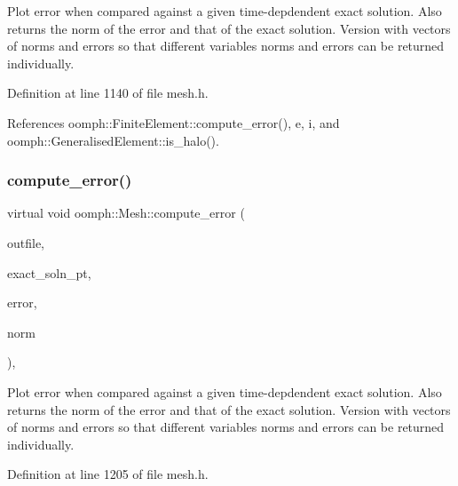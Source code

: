 Plot error when compared against a given time-\/depdendent exact solution. Also returns the norm of the error and that of the exact solution. Version with vectors of norms and errors so that different variables\textquotesingle{} norms and errors can be returned individually. 



Definition at line 1140 of file mesh.\+h.



References oomph\+::\+Finite\+Element\+::compute\+\_\+error(), e, i, and oomph\+::\+Generalised\+Element\+::is\+\_\+halo().

\mbox{\label{classoomph_1_1Mesh_aaf01468aaed8c208faa4bdb474b9519e}} 
\subsubsection{\texorpdfstring{compute\+\_\+error()}{compute\_error()}\hspace{0.1cm}{\footnotesize\ttfamily [4/4]}}
{\footnotesize\ttfamily virtual void oomph\+::\+Mesh\+::compute\+\_\+error (\begin{DoxyParamCaption}\item[{std\+::ostream \&}]{outfile,  }\item[{\hyperlink{classoomph_1_1FiniteElement_a690fd33af26cc3e84f39bba6d5a85202}{Finite\+Element\+::\+Steady\+Exact\+Solution\+Fct\+Pt}}]{exact\+\_\+soln\+\_\+pt,  }\item[{\hyperlink{classoomph_1_1Vector}{Vector}$<$ double $>$ \&}]{error,  }\item[{\hyperlink{classoomph_1_1Vector}{Vector}$<$ double $>$ \&}]{norm }\end{DoxyParamCaption})\hspace{0.3cm}{\ttfamily [inline]}, {\ttfamily [virtual]}}



Plot error when compared against a given time-\/depdendent exact solution. Also returns the norm of the error and that of the exact solution. Version with vectors of norms and errors so that different variables\textquotesingle{} norms and errors can be returned individually. 



Definition at line 1205 of file mesh.\+h.



